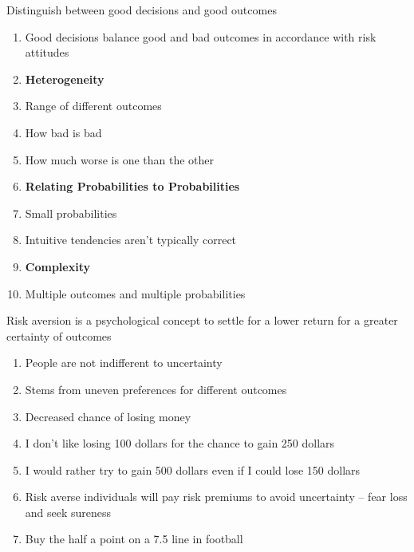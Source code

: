 \documentclass[aspectratio=1610,pdftex,dvipsnames,compress,xcolor={dvipsnames}]{beamer}
\begin{document}
\begin{frame}{Distinguish between good decisions and good outcomes}
    \begin{enumerate}[series=outerlist,topsep=0pt,itemsep=1pt,leftmargin=*,label=(\arabic*)]
        \item[]Good decisions balance good and bad outcomes in accordance with risk attitudes
            \vspace{0.10in}
        \item[]\textbf{Heterogeneity}
        \item[]Range of different outcomes  
        \item[]How bad is bad  
        \item[]How much worse is one than the other
            \vspace{0.10in}
        \item[]\textbf{Relating Probabilities to Probabilities}
        \item[]Small probabilities  
        \item[]Intuitive tendencies aren't typically correct
            \vspace{0.10in}
        \item[]\textbf{Complexity}
        \item[]Multiple outcomes and multiple probabilities
    \end{enumerate}
\end{frame}


\begin{frame}{Risk aversion is a psychological concept to settle for a lower return for a greater certainty of outcomes}
    \begin{enumerate}[series=outerlist,topsep=0pt,itemsep=15pt,leftmargin=*,label=(\arabic*)]
        \item[]People are not indifferent to uncertainty  
        \item[]Stems from uneven preferences for different outcomes
        \item[]Decreased chance of losing money
        \item[]I don't like losing 100 dollars for the chance to gain 250 dollars
        \item[]I would rather try to gain 500 dollars even if I could lose 150 dollars
        \item[]Risk averse individuals will pay risk premiums to avoid uncertainty -- fear loss and seek sureness
        \item[]Buy the half a point on a 7.5 line in football
    \end{enumerate}
\end{frame}
\end{document}
